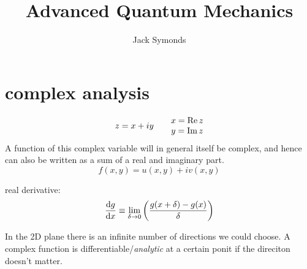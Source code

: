 \documentclass[10pt, a4paper, twocolumn]{article}
\author{Jack Symonds}
\title{Advanced Quantum Mechanics}
\date{}
\begin{document}
\maketitle

\section{complex analysis}

\[
z=x+iy \qquad
\mqty{x = \Re z \\ y = \Im z}
\]
A function of this complex variable will in general itself be complex, and hence can also be written as a sum of a real and imaginary part.
\[f(x,y) = u(x,y)+iv(x,y)\]

real derivative:
\[\dv{g}{x} \equiv \lim _{\delta \rightarrow 0}
\pqty{\frac{g(x+\delta)-g(x)}{\delta}}\]

In the 2D plane there is an infinite number of directions we could choose. A complex function is differentiable/\emph{analytic} at a certain ponit if the direciton doesn't matter.
\end{document}
